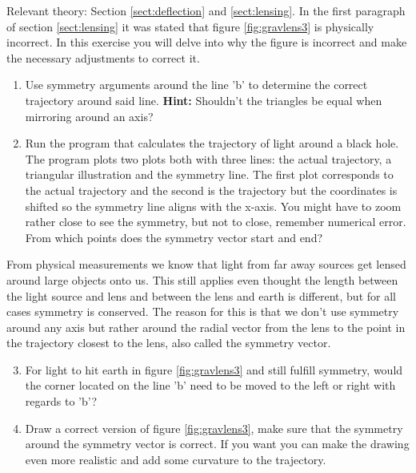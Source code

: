 {\begin{multicols}{2}
Relevant theory: Section \ref{sect:deflection} and \ref{sect:lensing}.\newline
In the first paragraph of section \ref{sect:lensing} it was stated that figure \ref{fig:gravlens3} is physically incorrect. In this exercise you will delve into why the figure is incorrect and make the necessary adjustments to correct it.
\begin{enumerate}
\item Use symmetry arguments around the line 'b' to determine the correct trajectory around said line. \textbf{Hint:} Shouldn't the triangles be equal when mirroring around an axis? 
\item Run the program that calculates the trajectory of light around a black hole. The program plots two plots both with three lines: the actual trajectory, a triangular illustration and the symmetry line. The first plot corresponds to the actual trajectory and the second is the trajectory but the coordinates is shifted so the symmetry line aligns with the x-axis. You might have to zoom rather close to see the symmetry, but not to close, remember numerical error. From which points does the symmetry vector start and end?
\end{enumerate}
From physical measurements we know that light from far away sources get lensed around large objects onto us. This still applies even thought the length between the light source and lens and between the lens and earth is different, but for all cases symmetry is conserved. The reason for this is that we don't use symmetry around any axis but rather around the radial vector from the lens to the point in the trajectory closest to the lens, also called the symmetry vector.
\begin{enumerate}
\setcounter{enumi}{2} 
\item For light to hit earth in figure \ref{fig:gravlens3} and still fulfill symmetry, would the corner located on the line 'b' need to be moved to the left or right with regards to 'b'?
\item Draw a correct version of figure \ref{fig:gravlens3}, make sure that the symmetry around the symmetry vector is correct. If you want you can make the drawing even more realistic and add some curvature to the trajectory.
\end{enumerate}

\vspace{1cm}



\end{multicols}}
